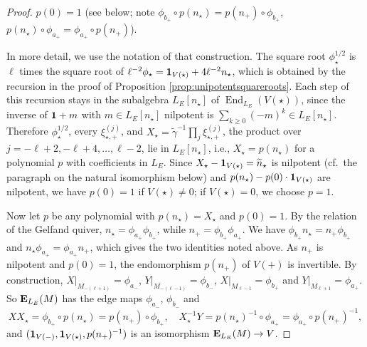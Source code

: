 \documentclass[a4paper,12pt,reqno]{amsart}
\newcommand{\EE}{{\rm\bf E}}
\DeclareMathOperator{\End}{\mathrm{End}}
\theoremstyle{plain}
\theoremstyle{remark}
\begin{document}
\begin{proof}
$p(0)=1$ (see below; note $\phi_{b_+}\circ p(n_\star)=p(n_+)\circ\phi_{b_+}$, $p(n_\star)\circ\phi_{a_+}=\phi_{a_+}\circ p(n_+)$).

    In more detail, we use the notation of that construction. The square root $\phi_\star^{1/2}$ is $\ell$ times the square root of $\ell^{-2}\phi_\star={\bf1}_{V(\star)}+4\ell^{-2}n_\star$, which is obtained by the recursion in the proof of Proposition \ref{prop:unipotentsquareroots}. Each step of this recursion stays in the subalgebra $L_E[n_\star]$ of $\End_{L_E}(V(\star))$, since the inverse of ${\bf1}+m$ with $m\in L_E[n_\star]$ nilpotent is $\sum_{k\geq0}(-m)^k\in L_E[n_\star]$. Therefore $\phi_\star^{1/2}$, every $\xi_{\star,+}^{(j)}$, and $X_\star=\widetilde{\gamma}^{-1}\prod_j\xi_{\star,+}^{(j)}$, the product over $j=-\ell+2,-\ell+4,\dots,\ell-2$, lie in $L_E[n_\star]$, i.e., $X_\star=p(n_\star)$ for a polynomial $p$ with coefficients in $L_E$. Since $X_\star-{\bf1}_{V(\star)}=\widetilde{n}_\star$ is nilpotent (cf.\ the paragraph on the natural isomorphism below) and $p(n_\star)-p(0)\cdot{\bf1}_{V(\star)}$ are nilpotent, we have $p(0)=1$ if $V(\star)\neq0$; if $V(\star)=0$, we choose $p=1$.

    Now let $p$ be any polynomial with $p(n_\star)=X_\star$ and $p(0)=1$. By the relation of the Gelfand quiver, $n_\star=\phi_{a_+}\phi_{b_+}$, while $n_+=\phi_{b_+}\phi_{a_+}$. We have $\phi_{b_+}n_\star=n_+\phi_{b_+}$ and $n_\star\phi_{a_+}=\phi_{a_+}n_+$, which gives the two identities noted above. As $n_+$ is nilpotent and $p(0)=1$, the endomorphism $p(n_+)$ of $V(+)$ is invertible. By construction, $X|_{M_{-(\ell+1)}}=\phi_{a_-}$, $Y|_{M_{-(\ell-1)}}=\phi_{b_-}$, $X|_{M_{\ell-1}}=\phi_{b_+}$ and $Y|_{M_{\ell+1}}=\phi_{a_+}$. So $\EE_{L_E}(M)$ has the edge maps $\phi_{a_-}$, $\phi_{b_-}$ and
    \[
    XX_\star=\phi_{b_+}\circ p(n_\star)=p(n_+)\circ\phi_{b_+},\quad
    X_\star^{-1}Y=p(n_\star)^{-1}\circ\phi_{a_+}=\phi_{a_+}\circ p(n_+)^{-1},
    \]
    and $({\bf1}_{V(-)},{\bf1}_{V(\star)},p(n_+)^{-1})$ is an isomorphism $\EE_{L_E}(M)\to V$.
    \end{proof}
\end{document}
